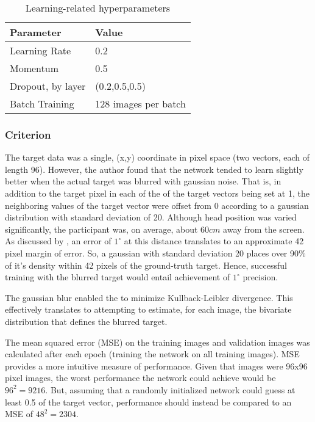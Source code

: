 \documentclass[10pt,letterpaper]{article}
\begin{document}
\begin{table}[b]
\begin{center} 
\caption{Learning-related hyperparameters} 
\label{tricks} 
\vskip 0.12in
\begin{tabular}{ll} 
\hline
Parameter    &  Value \\
\hline
Learning Rate  &  0.2 \\
Momentum        &   0.5 \\
Dropout, by layer   &   (0.2,0.5,0.5) \\
Batch Training  & 128 images per batch \\
\hline
\end{tabular} 
\end{center} 
\end{table}

\subsubsection{Criterion}

The target data was a single, (x,y) coordinate in pixel space (two vectors, each of length 96). However, the author found that the network tended to learn slightly better when the actual target was blurred with gaussian noise. That is, in addition to the target pixel in each of the of the target vectors being set at 1, the neighboring values of the target vector were offset from 0 according to a gaussian distribution with standard deviation of 20. Although head position was varied significantly, the participant was, on average, about $60cm$ away from the screen. As discussed by , an error of $1^{\circ}$ at this distance translates to an approximate 42 pixel margin of error. So, a gaussian with standard deviation 20 places over 90\% of it's density within 42 pixels of the ground-truth target. Hence, successful training with the blurred target would entail achievement of $1^{\circ}$ precision.

The gaussian blur enabled the to minimize Kullback-Leibler divergence. This effectively translates to attempting to estimate, for each image, the bivariate distribution that defines the blurred target.

The mean squared error (MSE) on the training images and validation images was calculated after each epoch (training the network on all training images). MSE provides a more intuitive measure of performance. Given that images were 96x96 pixel images, the worst performance the network could achieve would be $96^{2}=9216$. But, assuming that a randomly initialized network could guess at least 0.5 of the target vector, performance should instead be compared to an MSE of $48^{2}=2304$.
\end{document}
